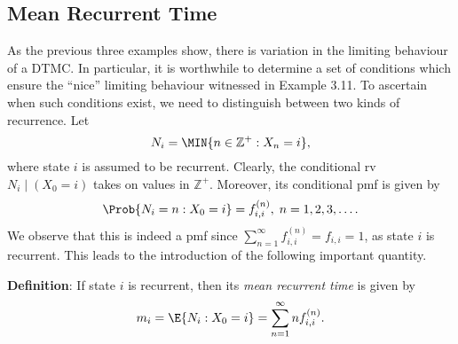 \subsection*{Mean Recurrent Time}
As the previous three examples show, there is variation in the limiting behaviour of a DTMC\@.
In particular, it is worthwhile to determine a set of conditions which ensure the ``nice'' limiting
behaviour witnessed in Example 3.11. To ascertain when such conditions exist, we need to
distinguish between two kinds of recurrence. Let
\[ N_i=\MIN{n\in\mathbb{Z}^+:X_n=i}, \]
where state $ i $ is assumed to be recurrent. Clearly, the conditional rv $ N_i\mid(X_0=i) $ takes
on values in $ \mathbb{Z}^+ $. Moreover, its conditional pmf is given by
\[ \Prob{N_i=n\given X_0=i}=f_{i,i}^{(n)},\;n=1,2,3,\ldots. \]
We observe that this is indeed a pmf since $ \sum_{n=1}^{\infty} f_{i,i}^{(n)}=f_{i,i}=1 $,
as state $ i $ is recurrent. This
leads to the introduction of the following important quantity.
\begin{Regular}
    \textbf{Definition}: If state $ i $ is recurrent, then its \emph{mean recurrent time} is given by
    \[ m_i=\E{N_i\given X_0=i}=\sum_{n=1}^{\infty} n f_{i,i}^{(n)}. \]
\end{Regular}
